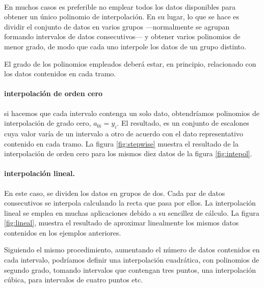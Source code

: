 \begin{figure}
\centering
{} %
{}\\
\end{figure}

\begin{paracol}{2}
En muchos casos es preferible no emplear todos los datos disponibles para obtener un único polinomio de interpolación. En su lugar, lo que se hace es dividir el conjunto de datos en varios grupos ---normalmente se agrupan formando intervalos de datos consecutivos--- y obtener varios polinomios de menor grado, de modo que cada uno interpole los datos de un grupo distinto. 

El grado de los polinomios empleados deberá estar, en principio, relacionado con los datos contenidos en cada tramo.


\paragraph{interpolación de orden cero}  si hacemos que cada intervalo contenga un solo dato, obtendríamos polinomios de interpolación de grado cero, $a_{0i}=y_i$. El resultado, es un conjunto de escalones cuya valor varía de un intervalo a otro de acuerdo con el dato representativo contenido en cada tramo. La figura \ref{fig:stepwise} muestra el resultado de la interpolación de orden cero para los mismos diez datos de la figura \ref{fig:intepol}.

\paragraph{interpolación lineal.}  En este caso, se dividen los datos en grupos de dos. Cada par de datos consecutivos se interpola calculando la recta que pasa por ellos. La interpolación lineal se emplea en muchas aplicaciones debido a su sencillez de cálculo. La figura \ref{fig:lineal}, muestra el resultado de aproximar linealmente los mismos datos contenidos en los ejemplos anteriores.

Siguiendo el mismo procedimiento, aumentando el número de datos contenidos en cada intervalo, podríamos definir una interpolación cuadrática, con polinomios de segundo grado, tomando intervalos que contengan tres puntos, una interpolación cúbica, para intervalos de cuatro puntos etc.


\end{paracol}
